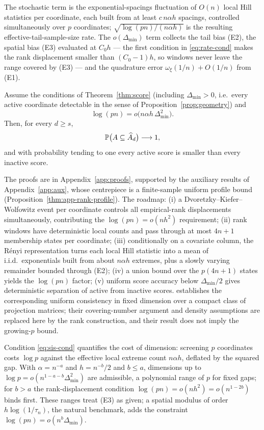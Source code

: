 The stochastic term is the exponential-spacings fluctuation of
$O(n)$ local Hill statistics per coordinate, each built from at least
$c\,n\alpha h$ spacings, controlled simultaneously over $p$ coordinates;
$\sqrt{\log(pn)/(n\alpha h)}$ is the resulting effective-tail-sample-size
rate. The $o(\Delta_{\min})$ term collects the tail bias (E2), the spatial
bias (E3) evaluated at $C_0h$ --- the first condition in
\eqref{eq:rate-cond} makes the rank displacement smaller than $(C_0-1)h$,
so windows never leave the range covered by (E3) --- and the quadrature
error $\omega_\xi(1/n)+O(1/n)$ from (E1).

\begin{theorem}\label{thm:sis}
Assume the conditions of Theorem~\ref{thm:score} (including
$\Delta_{\min}>0$, i.e.\ every active coordinate detectable in the
sense of Proposition~\ref{prop:geometry}) and
\begin{equation}\label{eq:sis-cond}
 \log(pn)=o\bigl(n\alpha h\,\Delta_{\min}^2\bigr).
\end{equation}
Then, for every $d\ge s$,
\[
 \mathbb P\bigl(A\subseteq\widehat{A}_d\bigr)\longrightarrow1,
\]
and with probability tending to one every active score is smaller than
every inactive score.
\end{theorem}


The proofs are in Appendix~\ref{app:proofs}, supported by the auxiliary
results of Appendix~\ref{app:aux}, whose centrepiece is a finite-sample
uniform profile bound (Proposition~\ref{thm:app-rank-profile}). The
roadmap: (i) a Dvoretzky--Kiefer--Wolfowitz event per coordinate controls
all empirical-rank displacements simultaneously, contributing the
$\log(pn)=o(nh^2)$ requirement; (ii) rank windows have deterministic
local counts and pass through at most $4n+1$ membership states per
coordinate; (iii) conditionally on a covariate column, the R\'enyi
representation turns each local Hill statistic into a mean of
i.i.d.\ exponentials built from about $n\alpha h$ extremes, plus a
slowly varying remainder bounded through (E2); (iv) a union bound over
the $p(4n+1)$ states yields the $\log(pn)$ factor; (v) uniform score
accuracy below $\Delta_{\min}/2$ gives deterministic separation of
active from inactive scores. \citet[Theorem~3]{gardesPodgorny2025}
establishes the corresponding uniform consistency in fixed dimension
over a compact class of projection matrices; their covering-number
argument and density assumptions are replaced here by the rank
construction, and their result does not imply the growing-$p$ bound.

Condition \eqref{eq:sis-cond} quantifies the cost of dimension:
screening $p$ coordinates costs $\log p$ against the effective local
extreme count $n\alpha h$, deflated by the squared gap. With
$\alpha=n^{-a}$ and $h=n^{-b}/2$ and $b\le a$, dimensions up to
$\log p=o(n^{1-a-b}\Delta_{\min}^2)$ are admissible, a polynomial range
of $p$ for fixed gaps; for $b>a$ the rank-displacement condition
$\log(pn)=o(nh^2)=o(n^{1-2b})$ binds first. These ranges treat (E3) as given; a spatial modulus of order
$h\log(1/\tau_n)$, the natural benchmark, adds the constraint
$\log(pn)=o(n^{b}\Delta_{\min})$.
